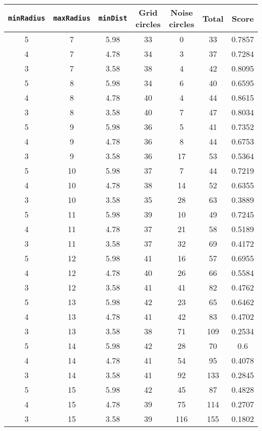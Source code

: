 \documentclass[letterpaper, 12pt]{article}
\begin{document}
\begin{longtable}{|c|c|c|c|c|c|c|}
\hline
\textbf{\texttt{minRadius}} & \textbf{\texttt{maxRadius}} & \textbf{\texttt{minDist}} & \textbf{Grid circles} & \textbf{Noise circles} & \textbf{Total} & \textbf{Score} \\
\hline
5 & 7 & 5.98 & 33 & 0 & 33 & 0.7857 \\
\hline
4 & 7 & 4.78 & 34 & 3 & 37 & 0.7284 \\
\hline
3 & 7 & 3.58 & 38 & 4 & 42 & 0.8095 \\
\hline
5 & 8 & 5.98 & 34 & 6 & 40 & 0.6595 \\
\hline
4 & 8 & 4.78 & 40 & 4 & 44 & 0.8615 \\
\hline
3 & 8 & 3.58 & 40 & 7 & 47 & 0.8034 \\
\hline
5 & 9 & 5.98 & 36 & 5 & 41 & 0.7352 \\
\hline
4 & 9 & 4.78 & 36 & 8 & 44 & 0.6753 \\
\hline
3 & 9 & 3.58 & 36 & 17 & 53 & 0.5364 \\
\hline
5 & 10 & 5.98 & 37 & 7 & 44 & 0.7219 \\
\hline
4 & 10 & 4.78 & 38 & 14 & 52 & 0.6355 \\
\hline
3 & 10 & 3.58 & 35 & 28 & 63 & 0.3889 \\
\hline
5 & 11 & 5.98 & 39 & 10 & 49 & 0.7245 \\
\hline
4 & 11 & 4.78 & 37 & 21 & 58 & 0.5189 \\
\hline
3 & 11 & 3.58 & 37 & 32 & 69 & 0.4172 \\
\hline
5 & 12 & 5.98 & 41 & 16 & 57 & 0.6955 \\
\hline
4 & 12 & 4.78 & 40 & 26 & 66 & 0.5584 \\
\hline
3 & 12 & 3.58 & 41 & 41 & 82 & 0.4762 \\
\hline
5 & 13 & 5.98 & 42 & 23 & 65 & 0.6462 \\
\hline
4 & 13 & 4.78 & 41 & 42 & 83 & 0.4702 \\
\hline
3 & 13 & 3.58 & 38 & 71 & 109 & 0.2534 \\
\hline
5 & 14 & 5.98 & 42 & 28 & 70 & 0.6 \\
\hline
4 & 14 & 4.78 & 41 & 54 & 95 & 0.4078 \\
\hline
3 & 14 & 3.58 & 41 & 92 & 133 & 0.2845 \\
\hline
5 & 15 & 5.98 & 42 & 45 & 87 & 0.4828 \\
\hline
4 & 15 & 4.78 & 39 & 75 & 114 & 0.2707 \\
\hline
3 & 15 & 3.58 & 39 & 116 & 155 & 0.1802 \\

\end{longtable}
\end{document}

